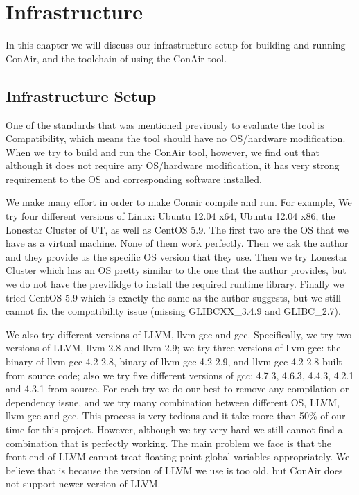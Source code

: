 \section{Infrastructure}
In this chapter we will discuss our infrastructure setup for building and
running ConAir, and the toolchain of using the ConAir tool.

\subsection{Infrastructure Setup}
One of the standards that was mentioned previously to evaluate the tool is
Compatibility, which means the tool should have no OS/hardware modification.
When we try to build and run the ConAir tool, however, we find out that although
it does not require any OS/hardware modification, it has very strong requirement
to the OS and corresponding software installed.

We make many effort in order to make Conair compile and run. For example, We try
four different versions of Linux: Ubuntu 12.04 x64, Ubuntu 12.04 x86, the
Lonestar Cluster of UT, as well as CentOS 5.9. The first two are the OS that we
have as a virtual machine. None of them work perfectly. Then we ask the
author and they provide us the specific OS version that they use. Then we try
Lonestar Cluster which has an OS pretty similar to the one that the author
provides, but we do not have the previlidge to install the required runtime
library. Finally we tried CentOS 5.9 which is exactly the same as the author
suggests, but we still cannot fix the compatibility issue (missing GLIBCXX\_3.4.9
and GLIBC\_2.7).

We also try different versions of LLVM, llvm-gcc and gcc. Specifically, we try
two versions of LLVM, llvm-2.8 and llvm 2.9; we try three versions of llvm-gcc:
the binary of llvm-gcc-4.2-2.8, binary of llvm-gcc-4.2-2.9, and llvm-gcc-4.2-2.8
built from source code; also we try five different versions of gcc: 4.7.3,
4.6.3, 4.4.3, 4.2.1 and 4.3.1 from source. For each try we do our best to remove
any compilation or dependency issue, and we try many combination between
different OS, LLVM, llvm-gcc and gcc. This process is very tedious and it take
more than 50\% of our time for this project. However, although we try very hard
we still cannot find a combination that is perfectly working. The main problem
we face is that the front end of LLVM cannot treat floating point global
variables appropriately. We believe that is because the version of LLVM we use
is too old, but ConAir does not support newer version of LLVM.

